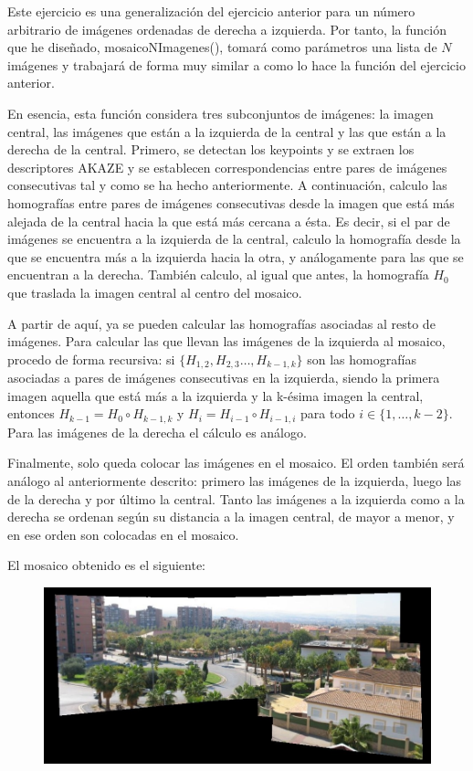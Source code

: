 \documentclass[10pt,a4paper]{article}
\begin{document}
Este ejercicio es una generalización del ejercicio anterior para un número arbitrario de imágenes ordenadas de derecha a izquierda. Por tanto, la función que he diseñado, mosaicoNImagenes(), tomará como parámetros una lista de $N$ imágenes y trabajará de forma muy similar a como lo hace la función del ejercicio anterior.

En esencia, esta función considera tres subconjuntos de imágenes: la imagen central, las imágenes que están a la izquierda de la central y las que están a la derecha de la central. Primero, se detectan los keypoints y se extraen los descriptores AKAZE y se establecen correspondencias entre pares de imágenes consecutivas tal y como se ha hecho anteriormente. A continuación, calculo las homografías entre pares de imágenes consecutivas desde la imagen que está más alejada de la central hacia la que está más cercana a ésta. Es decir, si el par de imágenes se encuentra a la izquierda de la central, calculo la homografía desde la que se encuentra más a la izquierda hacia la otra, y análogamente para las que se encuentran a la derecha. También calculo, al igual que antes, la homografía $H_0$ que traslada la imagen central al centro del mosaico.

A partir de aquí, ya se pueden calcular las homografías asociadas al resto de imágenes. Para calcular las que llevan las imágenes de la izquierda al mosaico, procedo de forma recursiva: si $\{H_{1,2},H_{2,3}\dots,H_{k-1,k}\}$ son las homografías asociadas a pares de imágenes consecutivas en la izquierda, siendo la primera imagen aquella que está más a la izquierda y la k-ésima imagen la central, entonces $H_{k-1} = H_0 \circ H_{k-1,k}$ y $H_{i} = H_{i-1} \circ H_{i-1,i}$ para todo $i \in \{1,\dots,k-2\}$. Para las imágenes de la derecha el cálculo es análogo.

Finalmente, solo queda colocar las imágenes en el mosaico. El orden también será análogo al anteriormente descrito: primero las imágenes de la izquierda, luego las de la derecha y por último la central. Tanto las imágenes a la izquierda como a la derecha se ordenan según su distancia a la imagen central, de mayor a menor, y en ese orden son colocadas en el mosaico.

El mosaico obtenido es el siguiente:

\begin{figure}[h]
	\includegraphics[width=\textwidth]{mosaicoNImgs}
\end{figure}
\end{document}
